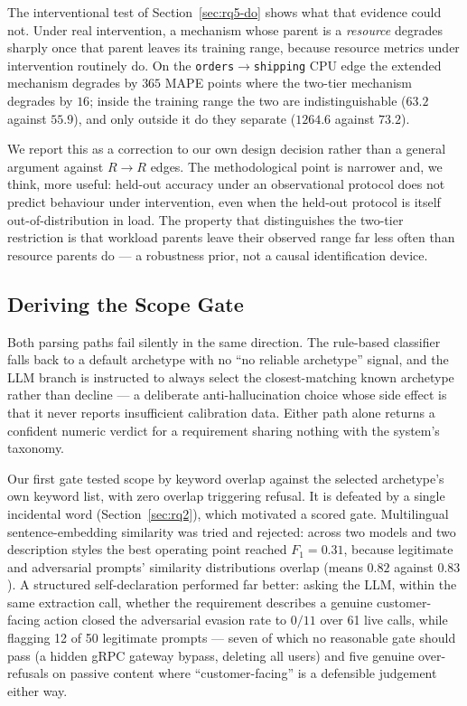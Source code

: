 \documentclass[journal, 10pt]{IEEEtran}
\begin{document}
The interventional test of Section~\ref{sec:rq5-do} shows what that evidence
could not. Under real intervention, a mechanism whose parent is a \emph{resource}
degrades sharply once that parent leaves its training range, because resource
metrics under intervention routinely do. On the
\texttt{orders}$\to$\texttt{shipping} CPU edge the extended mechanism degrades by
$365$ MAPE points where the two-tier mechanism degrades by $16$; inside the
training range the two are indistinguishable ($63.2$ against $55.9$), and only
outside it do they separate ($1264.6$ against $73.2$).

We report this as a correction to our own design decision rather than a general
argument against $R\to R$ edges. The methodological point is narrower and, we
think, more useful: held-out accuracy under an observational protocol does not
predict behaviour under intervention, even when the held-out protocol is itself
out-of-distribution in load. The property that distinguishes the two-tier
restriction is that workload parents leave their observed range far less often
than resource parents do --- a robustness prior, not a causal identification
device.


\subsection{Deriving the Scope Gate}
\label{sec:edge-of-scope}
Both parsing paths fail silently in the same direction. The rule-based classifier
falls back to a default archetype with no ``no reliable archetype'' signal, and
the LLM branch is instructed to always select the closest-matching known
archetype rather than decline --- a deliberate anti-hallucination choice whose
side effect is that it never reports insufficient calibration data. Either path
alone returns a confident numeric verdict for a requirement sharing nothing with
the system's taxonomy.

Our first gate tested scope by keyword overlap against the selected archetype's
own keyword list, with zero overlap triggering refusal. It is defeated by a
single incidental word (Section~\ref{sec:rq2}), which motivated a scored gate.
Multilingual sentence-embedding similarity was tried and rejected: across two
models \cite{wang2024multilinguale5} and two description styles the best
operating point reached $F_1 = 0.31$, because legitimate and adversarial prompts'
similarity distributions overlap (means $0.82$ against $0.83$). A structured
self-declaration performed far better: asking the LLM, within the same extraction
call, whether the requirement describes a genuine customer-facing action closed
the adversarial evasion rate to $0/11$ over 61 live calls, while flagging 12 of
50 legitimate prompts --- seven of which no reasonable gate should pass (a hidden
gRPC gateway bypass, deleting all users) and five genuine over-refusals on
passive content where ``customer-facing'' is a defensible judgement either way.
\end{document}
